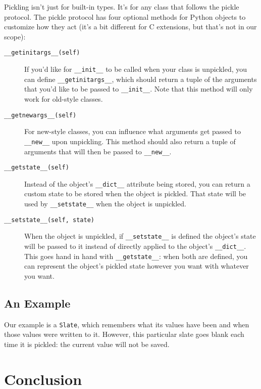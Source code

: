 \documentclass[a4paper,11pt]{article}
\newcommand{\code}[1]{\texttt{#1}}
\begin{document}
Pickling isn't just for built-in types. It's for any class that follows the pickle protocol. The pickle protocol has four optional methods for Python objects to customize how they act (it's a bit different for C extensions, but that's not in our scope):

\begin{description}

\item[\code{__getinitargs__(self)}]
If you'd like for \code{__init__} to be called when your class is unpickled, you can define \code{__getinitargs__}, which should return a tuple of the arguments that you'd like to be passed to  \code{__init__}. Note that this method will only work for old-style classes.
\item[\code{__getnewargs__(self)}]
For new-style classes, you can influence what arguments get passed to \code{__new__} upon unpickling. This method should also return a tuple of arguments that will then be passed to \code{__new__}.
\item[\code{__getstate__(self)}]
Instead of the object's \code{__dict__} attribute being stored, you can return a custom state to be stored when the object is pickled. That state will be used by \code{__setstate__} when the object is unpickled.
\item[\code{__setstate__(self, state)}]
When the object is unpickled, if \code{__setstate__} is defined the object's state will be passed to it instead of directly applied to the object's \code{__dict__}. This goes hand in hand with \code{__getstate__}: when both are defined, you can represent the object's pickled state however you want with whatever you want.

\end{description}

\subsection{An Example}

Our example is a \code{Slate}, which remembers what its values have been and when those values were written to it. However, this particular slate goes blank each time it is pickled: the current value will not be saved.



\section{Conclusion}
\end{document}
